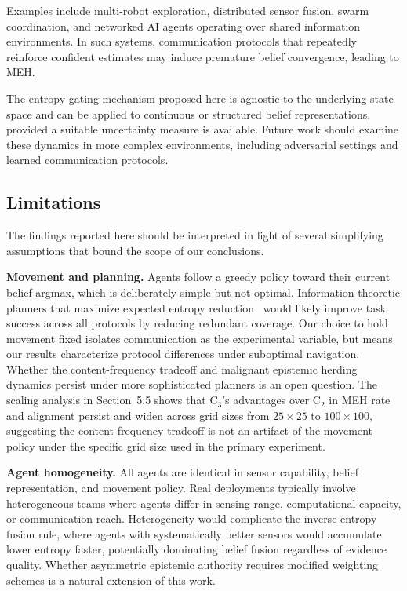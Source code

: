 \documentclass[pdflatex,sn-mathphys-num]{sn-jnl}%
\theoremstyle{thmstyleone}%
\theoremstyle{thmstyletwo}%
\theoremstyle{thmstylethree}%
\begin{document}
Examples include multi-robot exploration, distributed sensor fusion, swarm coordination, and networked AI agents operating over shared information environments. In such systems, communication protocols that repeatedly reinforce confident estimates may induce premature belief convergence, leading to MEH.

The entropy-gating mechanism proposed here is agnostic to the underlying state space and can be applied to continuous or structured belief representations, provided a suitable uncertainty measure is available. Future work should examine these dynamics in more complex environments, including adversarial settings and learned communication protocols.

\subsection{Limitations}
\label{sec:limitations}

The findings reported here should be interpreted in light of several simplifying assumptions that bound the scope of our conclusions.

\textbf{Movement and planning.} Agents follow a greedy policy toward their current belief argmax, which is deliberately simple but not optimal. Information-theoretic planners that maximize expected entropy reduction~\cite{charrow2015information, frew2009information} would likely improve task 
success across all protocols by reducing redundant coverage. Our choice to hold movement fixed isolates communication as the experimental variable, but means our results characterize protocol differences under suboptimal navigation. Whether the content-frequency tradeoff and malignant epistemic herding dynamics persist under more sophisticated planners is an open question. The scaling analysis in Section~5.5 shows that C$_3$'s advantages over C$_2$ in MEH rate and alignment persist and widen across grid sizes from $25 \times 25$ to $100 \times 100$, suggesting the content-frequency tradeoff is not an artifact of the movement policy under the specific grid size used in the primary experiment.


\textbf{Agent homogeneity.} All agents are identical in sensor capability, belief representation, and movement policy. Real deployments typically involve heterogeneous teams where agents differ in sensing range, computational capacity, or communication reach. 
Heterogeneity would complicate the inverse-entropy fusion rule, where agents with systematically better sensors would accumulate lower entropy faster, potentially dominating belief fusion regardless of evidence quality. Whether asymmetric epistemic authority requires 
modified weighting schemes is a natural extension of this work.
\end{document}
